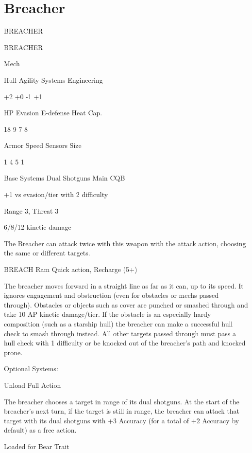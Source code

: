 \section{Breacher}

                                              BREACHER

 BREACHER

 Mech

 Hull       Agility      Systems       Engineering

 +2         +0           -1            +1

 HP         Evasion      E-defense     Heat Cap.

 18         9            7             8

 Armor      Speed        Sensors       Size

 1          4            5             1

Base Systems
Dual Shotguns
Main CQB

+1 vs evasion/tier with 2 difficulty

Range 3, Threat 3

6/8/12 kinetic damage

The Breacher can attack twice with this weapon with the attack action, choosing the same or
different targets.


BREACH Ram
Quick action, Recharge (5+)

The breacher moves forward in a straight line as far as it can, up to its speed. It ignores
engagement and obstruction (even for obstacles or mechs passed through). Obstacles or
objects such as cover are punched or smashed through and take 10 AP kinetic damage/tier. If
the obstacle is an especially hardy composition (such as a starship hull) the breacher can make a
successful hull check to smash through instead. All other targets passed through must pass a
hull check with 1 difficulty or be knocked out of the breacher’s path and knocked prone.


Optional Systems:

Unload
Full Action

The breacher chooses a target in range of its dual shotguns. At the start of the breacher’s next
turn, if the target is still in range, the breacher can attack that target with its dual shotguns with
+3 Accuracy (for a total of +2 Accuracy by default) as a free action.


Loaded for Bear
Trait





